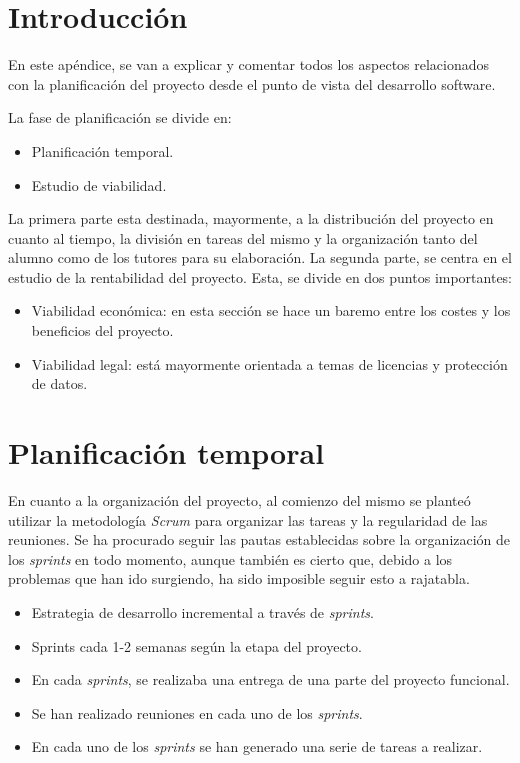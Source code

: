 
\section{Introducción}

En este apéndice, se van a explicar y comentar todos los aspectos relacionados con la planificación del proyecto desde el punto de vista del desarrollo software.

La fase de planificación se divide en:
\begin{itemize}
    \item Planificación temporal.
    \item Estudio de viabilidad.
\end{itemize}

La primera parte esta destinada, mayormente, a la distribución del proyecto en cuanto al tiempo, la división en tareas del mismo y la organización tanto del alumno como de los tutores para su elaboración.
La segunda parte, se centra en el estudio de la rentabilidad del proyecto. Esta, se divide en dos puntos importantes:
\begin{itemize}
    \item Viabilidad económica: en esta sección se hace un baremo entre los costes y los beneficios del proyecto.
    \item Viabilidad legal: está mayormente orientada a temas de licencias y protección de datos.
\end{itemize}


\section{Planificación temporal}

En cuanto a la organización del proyecto, al comienzo del mismo se planteó utilizar la metodología \textit{Scrum} para organizar las tareas y la regularidad de las reuniones. 
Se ha procurado seguir las pautas establecidas sobre la organización de los \textit{sprints} en todo momento, aunque también es cierto que, debido a los problemas que han ido surgiendo, ha sido imposible seguir esto a rajatabla.

\begin{itemize}
    \item Estrategia de desarrollo incremental a través de \textit{sprints}.
    \item Sprints cada 1-2 semanas según la etapa del proyecto.
    \item En cada \textit{sprints}, se realizaba una entrega de una parte del proyecto funcional.
    \item Se han realizado reuniones en cada uno de los \textit{sprints}.
    \item En cada uno de los \textit{sprints} se han generado una serie de tareas a realizar.
\end{itemize}

